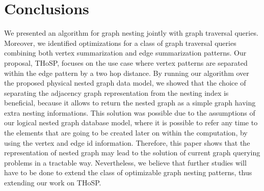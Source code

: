 \section{Conclusions}
We presented an algorithm for graph nesting jointly with graph traversal queries. Moreover, we identified optimizations for a class of graph traversal queries combining both vertex summarization and edge summarization patterns. Our proposal, THoSP, focuses on the use case where vertex patterns are separated within the edge pattern by a two hop distance. By running our algorithm over the proposed physical nested graph data model, we showed that the choice of separating the adjacency graph representation from the nesting index is beneficial, because it allows to return the nested graph as a simple graph having extra nesting informations. This solution was possible due to the assumptions of our logical nested graph database model, where  it is possible to refer any time to the elements that are going to be created later on within the computation, by  using the vertex and edge id information.  Therefore, this paper shows that the representation of nested graph may lead to the solution of current graph querying problems in a tractable way. Nevertheless, we believe that further studies will have to be done to extend the class of optimizable graph nesting patterns, thus extending our work on THoSP.
